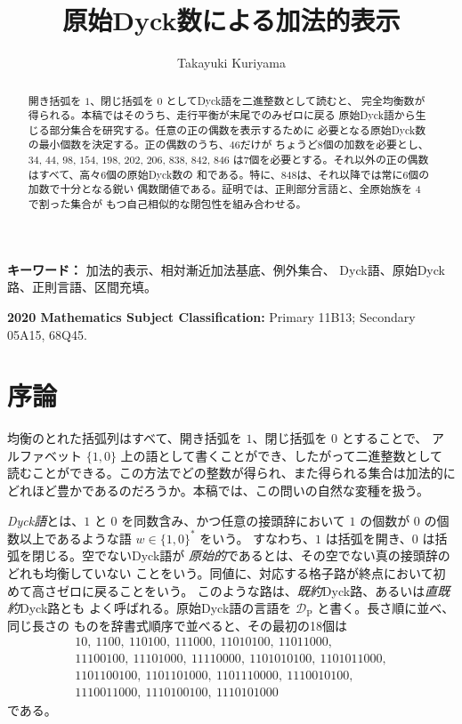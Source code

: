 \documentclass[12pt]{ltjsarticle}
\title{原始Dyck数による加法的表示}
\author{Takayuki Kuriyama}
\date{}
\theoremstyle{plain}
\newcommand{\DP}{\mathcal{D}_{\mathrm{P}}}
\begin{document}
\maketitle

\begin{abstract}
開き括弧を $1$、閉じ括弧を $0$ としてDyck語を二進整数として読むと、
完全均衡数が得られる。本稿ではそのうち、走行平衡が末尾でのみゼロに戻る
原始Dyck語から生じる部分集合を研究する。任意の正の偶数を表示するために
必要となる原始Dyck数の最小個数を決定する。正の偶数のうち、$46$だけが
ちょうど8個の加数を必要とし、
$34$, $44$, $98$, $154$, $198$, $202$, $206$, $838$, $842$, $846$
は7個を必要とする。それ以外の正の偶数はすべて、高々6個の原始Dyck数の
和である。特に、$848$は、それ以降では常に6個の加数で十分となる鋭い
偶数閾値である。証明では、正則部分言語と、全原始族を $4$ で割った集合が
もつ自己相似的な閉包性を組み合わせる。
\end{abstract}

\noindent\textbf{キーワード：} 加法的表示、相対漸近加法基底、例外集合、
Dyck語、原始Dyck路、正則言語、区間充填。

\noindent\textbf{2020 Mathematics Subject Classification:} Primary 11B13;
Secondary 05A15, 68Q45.

\section{序論}\label{sec:introduction}

均衡のとれた括弧列はすべて、開き括弧を $1$、閉じ括弧を $0$ とすることで、
アルファベット $\{1,0\}$ 上の語として書くことができ、したがって二進整数として
読むことができる。この方法でどの整数が得られ、また得られる集合は加法的に
どれほど豊かであるのだろうか。本稿では、この問いの自然な変種を扱う。

\emph{Dyck語}とは、$1$ と $0$ を同数含み、かつ任意の接頭辞において
$1$ の個数が $0$ の個数以上であるような語 $w\in\{1,0\}^*$ をいう。
すなわち、$1$ は括弧を開き、$0$ は括弧を閉じる。空でないDyck語が
\emph{原始的}であるとは、その空でない真の接頭辞のどれも均衡していない
ことをいう。同値に、対応する格子路が終点において初めて高さゼロに戻ることをいう。
このような路は、\emph{既約}Dyck路、あるいは\emph{直既約}Dyck路とも
よく呼ばれる。原始Dyck語の言語を $\DP$ と書く。長さ順に並べ、同じ長さの
ものを辞書式順序で並べると、その最初の18個は
\[
\begin{gathered}
10,\ 1100,\ 110100,\ 111000,\ 11010100,\ 11011000,\\
11100100,\ 11101000,\ 11110000,\ 1101010100,\ 1101011000,\\
1101100100,\ 1101101000,\ 1101110000,\ 1110010100,\\
1110011000,\ 1110100100,\ 1110101000
\end{gathered}
\]
である。
\end{document}
